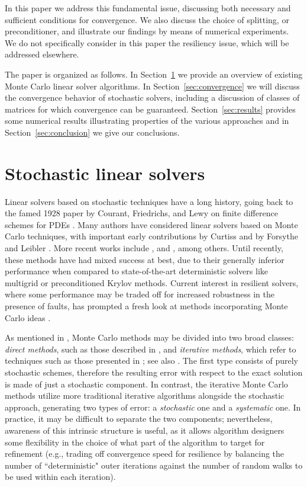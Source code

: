 \documentclass[final,leqno,onefignum,onetabnum]{siamltex1213}
\begin{document}
In this paper we address this fundamental issue,
discussing both necessary and sufficient conditions for convergence.
We also discuss the choice of splitting, or preconditioner, and illustrate
our findings by means of numerical experiments.
We do not specifically
consider in this paper the resiliency issue, which will be addressed
elsewhere.

The paper is organized as follows.
In Section~\ref{sec:mcls} we provide an overview of existing Monte Carlo
linear solver algorithms.
In Section~\ref{sec:convergence} we will discuss the convergence behavior
of stochastic solvers, including a discussion of classes of matrices for
which convergence can be guaranteed.
Section~\ref{sec:results} provides some numerical results illustrating
properties of the various approaches and in Section~\ref{sec:conclusion} we
give our conclusions.


\section{Stochastic linear solvers}
\label{sec:mcls}

Linear solvers based on stochastic techniques have a
long history,
going back to the famed 1928 paper by Courant, Friedrichs, and Lewy
on finite difference schemes for PDEs \cite{CFL}.
Many authors have considered linear solvers based on Monte Carlo
techniques, with important early contributions by
Curtiss \cite{Curtiss} and by Forsythe and Leibler \cite{FL50}.
More recent works include \cite{AADBTW2005,Hal1994},
and \cite{DA1998}, among others.
Until recently,
these methods have had mixed success at best,
due to their generally inferior performance when compared to state-of-the-art
deterministic solvers like multigrid or preconditioned Krylov methods.
Current interest in resilient solvers, where some performance may be
traded off for increased robustness in the presence of faults, has prompted a fresh
look at methods incorporating Monte Carlo ideas
\cite{EMSH2014,ESW2013,Slattery2013}.

As mentioned in \cite{DA1998}, Monte Carlo methods may be divided into two broad
classes: \textit{direct methods}, such as those described in \cite{DA1998,DVA2001}, and
\textit{iterative methods}, which refer to techniques such as those presented
in \cite{Hal1962,Hal1994}; see also \cite{EMSH2014,ESW2013}.
The first type consists of purely stochastic schemes,
therefore the resulting error with respect to the exact solution is made of
just a stochastic component. In contrast, the iterative Monte Carlo methods utilize more
traditional iterative algorithms alongside the stochastic approach,
generating two types of error: a
\textit{stochastic} one and a \textit{systematic} one.
In practice, it may be difficult to separate the two components;
nevertheless, awareness of this intrinsic structure is useful, as it allows
algorithm designers some flexibility in the choice of what part of the algorithm
to target for refinement (e.g., trading off convergence speed for resilience by
balancing the number of ``deterministic" outer iterations
against the number of random walks to be used within each iteration).
\end{document}
